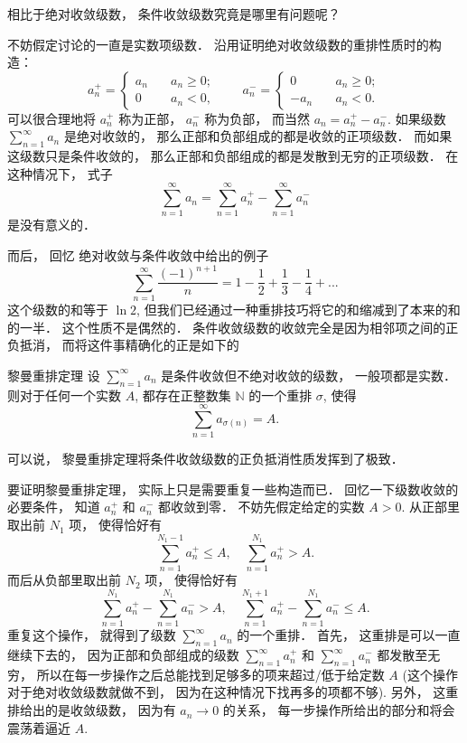 

相比于绝对收敛级数， 条件收敛级数究竟是哪里有问题呢？ 

不妨假定讨论的一直是实数项级数． 沿用证明绝对收敛级数的重排性质时的构造： 
$$
a_n^+=\left\{\begin{array}{cc}
{a_n}\quad &a_n\geq0;\\
0\quad &a_n<0,
\end{array}\right.
\quad\quad
a_n^-=\left\{\begin{array}{cc}
0\quad &a_n\geq0;\\
-a_n\quad &a_n<0.
\end{array}\right.
$$
可以很合理地将 $a_n^+$ 称为正部， $a_n^-$ 称为负部， 而当然 $a_n=a_n^+-a_n^-$. 如果级数 $\sum_{n=1}^\infty a_n$ 是绝对收敛的， 那么正部和负部组成的都是收敛的正项级数． 而如果这级数只是条件收敛的， 那么正部和负部组成的都是发散到无穷的正项级数． 在这种情况下， 式子
$$
\sum_{n=1}^\infty a_n=\sum_{n=1}^\infty a_n^+-\sum_{n=1}^\infty a_n^-
$$
是没有意义的．

而后， 回忆 绝对收敛与条件收敛中给出的例子
$$
\sum_{n=1}^\infty\frac{(-1)^{n+1}}{n}
=1-\frac{1}{2}+\frac{1}{3}-\frac{1}{4}+...
$$
这个级数的和等于 $\ln2$, 但我们已经通过一种重排技巧将它的和缩减到了本来的和的一半． 这个性质不是偶然的． 条件收敛级数的收敛完全是因为相邻项之间的正负抵消， 而将这件事精确化的正是如下的

\begin{theorem}{黎曼重排定理}
设 $\sum_{n=1}^\infty a_n$ 是条件收敛但不绝对收敛的级数， 一般项都是实数． 则对于任何一个实数 $A$, 都存在正整数集 $\mathbb{N}$ 的一个重排 $\sigma$, 使得
$$
\sum_{n=1}^\infty a_{\sigma(n)}=A.
$$
\end{theorem}

可以说， 黎曼重排定理将条件收敛级数的正负抵消性质发挥到了极致．

要证明黎曼重排定理， 实际上只是需要重复一些构造而已． 回忆一下级数收敛的必要条件， 知道 $a_n^+$ 和 $a_n^-$ 都收敛到零． 不妨先假定给定的实数 $A>0$. 从正部里取出前 $N_1$ 项， 使得恰好有
\[
\sum_{n=1}^{N_1-1}a_n^+\leq A,
\quad
\sum_{n=1}^{N_1}a_n^+> A.
\]
而后从负部里取出前 $N_2$ 项， 使得恰好有
\[
\sum_{n=1}^{N_1}a_n^+-\sum_{n=1}^{N_1}a_n^-> A,
\quad
\sum_{n=1}^{N_1+1}a_n^+-\sum_{n=1}^{N_1}a_n^-\leq A.
\]
重复这个操作， 就得到了级数 $\sum_{n=1}^\infty a_n$ 的一个重排． 首先， 这重排是可以一直继续下去的， 因为正部和负部组成的级数 $\sum_{n=1}^\infty a_n^+$ 和 $\sum_{n=1}^\infty a_n^-$ 都发散至无穷， 所以在每一步操作之后总能找到足够多的项来超过/低于给定数 $A$ (这个操作对于绝对收敛级数就做不到， 因为在这种情况下找再多的项都不够). 另外， 这重排给出的是收敛级数， 因为有 $a_n\to0$ 的关系， 每一步操作所给出的部分和将会震荡着逼近 $A$.

